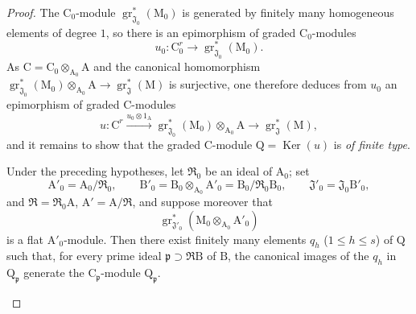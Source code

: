 \begin{proof}
The $\mathrm{C}_0$-module $\operatorname{gr}^*_{\mathfrak{J}_0}(\mathrm{M}_0)$ is generated by finitely many homogeneous elements of degree $1$, so there is an epimorphism of graded $\mathrm{C}_0$-modules
\[
  u_0:\mathrm{C}_0^r\longrightarrow\operatorname{gr}^*_{\mathfrak{J}_0}(\mathrm{M}_0).
\]
As $\mathrm{C}=\mathrm{C}_0\otimes_{\mathrm{A}_0}\mathrm{A}$ and the canonical homomorphism $\operatorname{gr}^*_{\mathfrak{J}_0}(\mathrm{M}_0)\otimes_{\mathrm{A}_0}\mathrm{A}\to\operatorname{gr}^*_\mathfrak{J}(\mathrm{M})$ is surjective, one therefore deduces from $u_0$ an epimorphism of graded $\mathrm{C}$-modules
\[
  u:\mathrm{C}^r\xrightarrow{u_0\otimes 1_{\mathrm{A}}}\operatorname{gr}^*_{\mathfrak{J}_0}(\mathrm{M}_0)\otimes_{\mathrm{A}_0}\mathrm{A}\longrightarrow\operatorname{gr}^*_\mathfrak{J}(\mathrm{M}),
\]
and it remains to show that the graded $\mathrm{C}$-module $\mathrm{Q}=\operatorname{Ker}(u)$ is \emph{of finite type}.

\begin{lemma}[11.2.9.6]
\label{IV.11.2.9.6}
Under the preceding hypotheses, let $\mathfrak{R}_0$ be an ideal of $\mathrm{A}_0$; set
\[
  \mathrm{A}'_0=\mathrm{A}_0/\mathfrak{R}_0,\qquad
  \mathrm{B}'_0=\mathrm{B}_0\otimes_{\mathrm{A}_0}\mathrm{A}'_0
  =\mathrm{B}_0/\mathfrak{R}_0\mathrm{B}_0,\qquad
  \mathfrak{J}'_0=\mathfrak{J}_0\mathrm{B}'_0,
\]
and $\mathfrak{R}=\mathfrak{R}_0\mathrm{A}$, $\mathrm{A}'=\mathrm{A}/\mathfrak{R}$, and suppose moreover that
\[
  \operatorname{gr}^*_{\mathfrak{J}'_0}
  (\mathrm{M}_0\otimes_{\mathrm{A}_0}\mathrm{A}'_0)
\]
is a flat $\mathrm{A}'_0$-module. Then there exist finitely many elements $q_h$ ($1\leqslant h\leqslant s$) of $\mathrm{Q}$ such that, for every prime ideal $\mathfrak{p}\supset\mathfrak{R}\mathrm{B}$ of $\mathrm{B}$, the canonical images of the $q_h$ in $\mathrm{Q}_\mathfrak{p}$ generate the $\mathrm{C}_\mathfrak{p}$-module $\mathrm{Q}_\mathfrak{p}$.
\end{lemma}


\end{proof}
